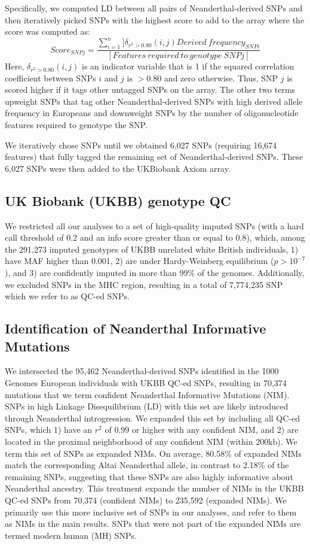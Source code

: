 Specifically, we computed LD between all pairs of Neanderthal-derived SNPs and then iteratively picked SNPs with the highest score to add to the array where the score was computed as:
$$Score_{SNP j} = \frac{\sum_{i=1}^n [\delta_{r^2>0.80} (i,j)Derived\ frequency_{SNP i}}{[Features\ required\ to\ genotype\ SNP j]}$$
Here, $\delta_{r^2>0.80} (i,j)$ is an indicator variable that is 1 if the squared correlation coefficient between SNPs $i$ and $j$ is $>0.80$ and zero otherwise. Thus, SNP $j$ is scored higher if it tags other untagged SNPs on the array. The other two terms upweight SNPs that tag other Neanderthal-derived SNPs with high derived allele frequency in Europeans and downweight SNPs by the number of oligonucleotide features required to genotype the SNP.

We iteratively chose SNPs until we obtained 6,027 SNPs (requiring 16,674 features) that fully tagged the remaining set of Neanderthal-derived SNPs. These 6,027 SNPs were then added to the UKBiobank Axiom array.

\subsection{UK Biobank (UKBB) genotype QC}
We restricted all our analyses to a set of high-quality imputed SNPs (with a hard call threshold of 0.2 and an info score greater than or equal to 0.8), which, among the 291,273 imputed genotypes of UKBB unrelated white British individuals, 1) have MAF higher than 0.001, 2) are under Hardy-Weinberg equilibrium ($p > 10^{-7}$), and 3) are confidently imputed in more than 99\% of the genomes. Additionally, we excluded SNPs in the MHC region, resulting in a total of 7,774,235 SNP which we refer to as QC-ed SNPs. 

\subsection{Identification of Neanderthal Informative Mutations}
We intersected the 95,462 Neanderthal-derived SNPs identified in the 1000 Genomes European individuals with UKBB QC-ed SNPs, resulting in 70,374 mutations that we term confident Neanderthal Informative Mutations (NIM). SNPs in high Linkage Disequilibrium (LD) with this set are likely introduced through Neanderthal introgression. We expanded this set by including all QC-ed SNPs, which 1) have an $r^2$ of 0.99 or higher with any confident NIM, and 2) are located in the proximal neighborhood of any confident NIM (within 200kb). We term this set of SNPs as expanded NIMs. On average, 80.58\% of expanded NIMs match the corresponding Altai Neanderthal allele, in contrast to 2.18\% of the remaining SNPs, suggesting that these SNPs are also highly informative about Neanderthal ancestry. This treatment expands the number of NIMs in the UKBB QC-ed SNPs from 70,374 (confident NIMs) to 235,592 (expanded NIMs). We primarily use this more inclusive set of SNPs in our analyses, and refer to them as NIMs in the main results. SNPs that were not part of the expanded NIMs are termed modern human (MH) SNPs.

